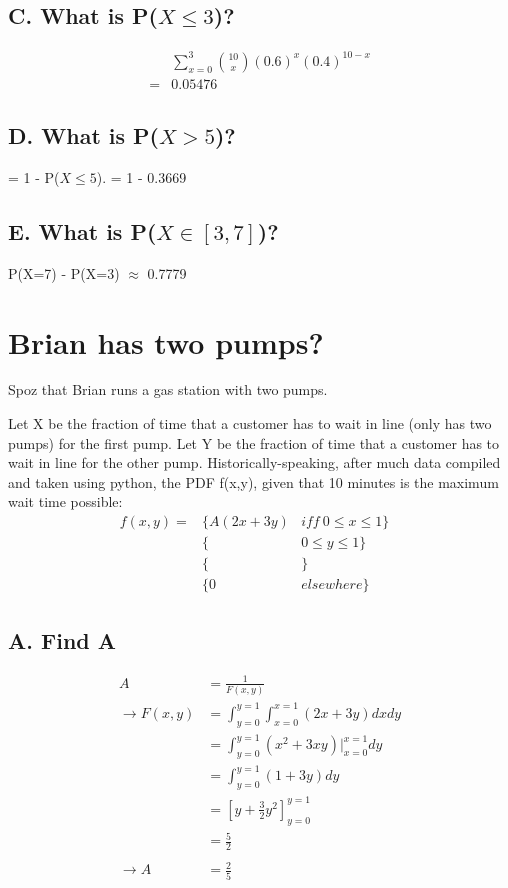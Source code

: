 \documentclass[]{article}
\begin{document}
		\subsection{C. What is P($X \leq 3$)?}
			\begin{align*}
				 &\sum_{x=0}^{3}\binom{10}{x}(0.6)^x(0.4)^{10-x} \\
				=& 0.05476
			\end{align*}
		\subsection{D. What is P($X > 5$)?}
			= 1 - P($X \leq 5$).
			= 1 - 0.3669
		\subsection{E. What is P($X \in [3, 7]$)?}
			P(X=7) - P(X=3) $\approx$ 0.7779

	\pagebreak
	\section{Brian has two pumps?}
		
		Spoz that Brian runs a gas station with two pumps.
		
		Let X be the fraction of time that a customer has to wait in line (only has two pumps) for the first pump. Let Y be the fraction of time that a customer has to wait in line for the other pump. Historically-speaking, after much data compiled and taken using python, the PDF f(x,y), given that 10 minutes is the maximum wait time possible:
		\begin{align*}
			f(x,y) = &\{A(2x + 3y)  &iff\   0\leq x\leq 1\}& \\
			&\{            &       0\leq y\leq 1\}& \\
			&\{            &                    \}& \\
			&\{0           &       elsewhere    \}&
		\end{align*}
		
		\subsection{A. Find A}
			\begin{align*}
			A      &= \frac{1}{F(x,y)} \\
			\to F(x,y) &= \int_{y=0}^{y=1}\int_{x=0}^{x=1}(2x+3y)dxdy \\
			&= \int_{y=0}^{y=1}(x^2 + 3xy)|_{x=0}^{x=1}dy \\
			&= \int_{y=0}^{y=1}(1 + 3y)dy \\
			&= [y + \frac{3}{2}y^2]_{y=0}^{y=1} \\
			&= \frac{5}{2} \\
			\\
			\to A      &= \frac{2}{5}
			\end{align*}
			
\end{document}

